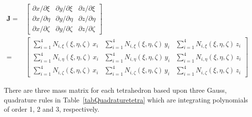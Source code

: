 \begin{equation}
\begin{aligned}
 \mathbf{J}= &
\begin{bmatrix}
\partial x / \partial\xi & \partial y / \partial\xi & \partial z / \partial\xi\\
\partial x / \partial\eta & \partial y / \partial\eta & \partial z / \partial\eta \\
\partial x / \partial\zeta & \partial y / \partial\zeta & \partial z / \partial\zeta 
\end{bmatrix}\\
  = & \begin{bmatrix}
\sum\nolimits_{i=1}^4 N_{i,\xi} (\xi,\eta,\zeta) \, x_i & \sum\nolimits_{i=1}^4 N_{i,\xi} (\xi,\eta,\zeta) \, y_i &
\sum\nolimits_{i=1}^4 N_{i,\xi} (\xi,\eta,\zeta) \, z_i\\
\sum\nolimits_{i=1}^4 N_{i,\eta} (\xi,\eta,\zeta) \, x_i & \sum\nolimits_{i=1}^4 N_{i,\eta} (\xi,\eta,\zeta) \, y_i &
\sum\nolimits_{i=1}^4 N_{i,\eta} (\xi,\eta,\zeta) \, z_i\\
\sum\nolimits_{i=1}^4 N_{i,\zeta} (\xi,\eta,\zeta) \, x_i & \sum\nolimits_{i=1}^4 N_{i,\zeta} (\xi,\eta,\zeta) \, y_i &
\sum\nolimits_{i=1}^4 N_{i,\zeta} (\xi,\eta,\zeta) \, z_i
\end{bmatrix}
\end{aligned}
\label{jacobiantet}
\end{equation}

There are three mass matrix for each tetrahedron based upon three Gauss, quadrature rules in Table~\ref{tabQuadraturetetra} which are integrating polynomials of order 1, 2 and 3, respectively. 

